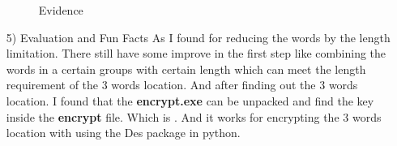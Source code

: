 \documentclass[margin 2cm]{report}
\begin{document}
\begin{enumerate}
\begin{figure}[H]
\centering
{}
\caption{Evidence}
\label{Fig.main}
\end{figure}

\normalsize\item[5)]{Evaluation and Fun Facts}
\newline\normalsize\indent\setlength{\parindent}{2em}As I found for reducing the words by the length limitation. There still have some improve in the first step like combining the words in a certain groups with certain length which can meet the length requirement of the 3 words location. And after finding out the 3 words location. I found that the \textbf{encrypt.exe} can be unpacked and find the key inside the \textbf{encrypt} file. Which is . And it works for encrypting the 3 words location with using the Des package in python.
\end{enumerate}
\end{document}
